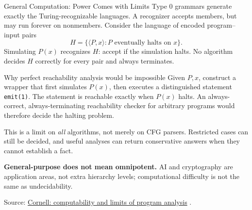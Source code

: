 \documentclass[10pt]{beamer}
\newcommand{\paperlink}[2]{%
  \href{#1}{\textcolor{blue!65!black}{#2}}%
}
\begin{document}
\begin{frame}{General Computation: Power Comes with Limits}
  \small
  Type 0 grammars generate exactly the Turing-recognizable languages.
  A recognizer accepts members, but may run forever on nonmembers.
  Consider the language of encoded program--input pairs
  \[
    H=\{\langle P,x\rangle:P\text{ eventually halts on }x\}.
  \]
  Simulating $P(x)$ recognizes $H$: accept if the simulation halts.
  No algorithm decides $H$ correctly for every pair and always terminates.
  \pause
  \begin{exampleblock}{Why perfect reachability analysis would be impossible}
    Given $P,x$, construct a wrapper that first simulates $P(x)$, then
    executes a distinguished statement \texttt{emit(1)}.
    The statement is reachable exactly when $P(x)$ halts. An always-correct,
    always-terminating reachability checker for arbitrary programs would
    therefore decide the halting problem.
  \end{exampleblock}
  \pause
  This is a limit on \emph{all} algorithms, not merely on CFG parsers.
  Restricted cases can still be decided, and useful analyses can return
  conservative answers when they cannot establish a fact.
  \par\smallskip
  \textbf{General-purpose does not mean omnipotent.} AI and cryptography
  are application areas, not extra hierarchy levels; computational
  difficulty is not the same as undecidability.
  \par
  {\scriptsize Source: \paperlink{https://www.cs.cornell.edu/courses/cs212/2000sp/notes/lectures/l28-computability.htm}
  {Cornell: computability and limits of program analysis}.}
\end{frame}
\end{document}
